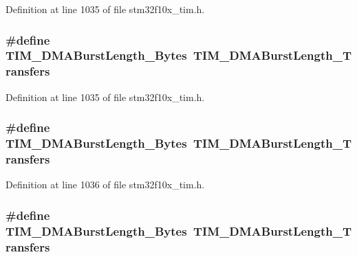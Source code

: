 Definition at line 1035 of file stm32f10x\+\_\+tim.\+h.

\subsubsection[{\texorpdfstring{T\+I\+M\+\_\+\+D\+M\+A\+Burst\+Length\+\_\+16\+Bytes}{TIM_DMABurstLength_16Bytes}}]{\setlength{\rightskip}{0pt plus 5cm}\#define T\+I\+M\+\_\+\+D\+M\+A\+Burst\+Length\+\_\+Bytes~{\bf T\+I\+M\+\_\+\+D\+M\+A\+Burst\+Length\+\_\+Transfers}}\hypertarget{group___t_i_m___legacy_ga672117a7dafcd778fe8e86db423b07e9}{}\label{group___t_i_m___legacy_ga672117a7dafcd778fe8e86db423b07e9}


Definition at line 1035 of file stm32f10x\+\_\+tim.\+h.

\subsubsection[{\texorpdfstring{T\+I\+M\+\_\+\+D\+M\+A\+Burst\+Length\+\_\+17\+Bytes}{TIM_DMABurstLength_17Bytes}}]{\setlength{\rightskip}{0pt plus 5cm}\#define T\+I\+M\+\_\+\+D\+M\+A\+Burst\+Length\+\_\+Bytes~{\bf T\+I\+M\+\_\+\+D\+M\+A\+Burst\+Length\+\_\+Transfers}}\hypertarget{group___t_i_m___legacy_gacffd0dc1f04aa06624a4980dcae6eede}{}\label{group___t_i_m___legacy_gacffd0dc1f04aa06624a4980dcae6eede}


Definition at line 1036 of file stm32f10x\+\_\+tim.\+h.

\subsubsection[{\texorpdfstring{T\+I\+M\+\_\+\+D\+M\+A\+Burst\+Length\+\_\+17\+Bytes}{TIM_DMABurstLength_17Bytes}}]{\setlength{\rightskip}{0pt plus 5cm}\#define T\+I\+M\+\_\+\+D\+M\+A\+Burst\+Length\+\_\+Bytes~{\bf T\+I\+M\+\_\+\+D\+M\+A\+Burst\+Length\+\_\+Transfers}}\hypertarget{group___t_i_m___legacy_gacffd0dc1f04aa06624a4980dcae6eede}{}\label{group___t_i_m___legacy_gacffd0dc1f04aa06624a4980dcae6eede}


